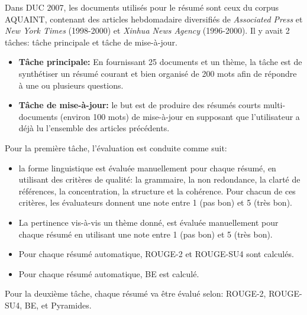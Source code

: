 \documentclass[a4paper,12pt,oneside]{../use/ESIthesis}
\begin{document}
Dans DUC 2007, les documents utilisés pour le résumé sont ceux du corpus AQUAINT, contenant des articles hebdomadaire diversifiés de \textit{Associated Press} et \textit{New York Times} (1998-2000) et \textit{Xinhua News Agency} (1996-2000).
Il y avait 2 tâches: tâche principale et tâche de mise-à-jour.
\begin{itemize}
\item \textbf{Tâche principale:} En fournissant 25 documents et un thème, la tâche est de synthétiser un résumé courant et bien organisé de 200 mots afin de répondre à une ou plusieurs questions. 

\item \textbf{Tâche de mise-à-jour:} le but est de produire des résumés courts multi-documents (environ 100 mots) de mise-à-jour en supposant que l'utilisateur a déjà lu l'ensemble des articles précédents.
\end{itemize}
Pour la première tâche, l'évaluation est conduite comme suit:
\begin{itemize}
\item la forme linguistique est évaluée manuellement pour chaque résumé, en utilisant des critères de qualité: la grammaire, la non redondance, la clarté de références, la concentration, la structure et la cohérence. 
Pour chacun de ces critères, les évaluateurs donnent une note entre 1 (pas bon) et 5 (très bon). 

\item La pertinence vis-à-vis un thème donné, est évaluée manuellement pour chaque résumé en utilisant une note entre 1 (pas bon) et 5 (très bon).

\item Pour chaque résumé automatique, ROUGE-2 et ROUGE-SU4 sont calculés.

\item Pour chaque résumé automatique, BE est calculé.
\end{itemize}
Pour la deuxième tâche, chaque résumé va être évalué selon: ROUGE-2, ROUGE-SU4, BE, et Pyramides.
\end{document}

